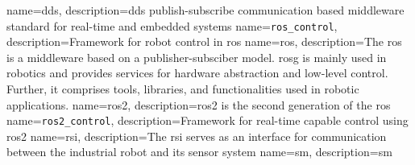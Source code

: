 \hyphenation{
}

\newcommand{\mybibliographyfiles}{Bibliography/ipr_articles,Bibliography/kit_template_example_bibliography,Bibliography/masterthesis}


{
    name=\gls{dds},
    description={\acrlong{dds} publish-subscribe communication based middleware standard for real-time and embedded systems \cite{noauthor_data_nodate}}
}
{
    name=\texttt{ros\_control},
    description={Framework for robot control in \gls{ros}}
}
{
    name=\gls{ros},
    description={The \acrlong{ros} is a middleware based on a publisher-subsciber model. \gls{rosg} is mainly used in robotics and provides services for hardware abstraction and low-level control. Further, it comprises tools, libraries, and functionalities used in robotic applications.}
}
{
    name=\gls{ros2},
    description={\acrlong{ros2} is the second generation of the \acrlong{ros} \cite{macenski_robot_2022}}
}
{
    name=\texttt{ros2\_control},
    description={Framework for real-time capable control using \gls{ros2}}
}
{
    name=\gls{rsi},
    description={The \acrlong{rsi} serves as an interface for communication between the industrial robot and its sensor system }
}
{
    name=\gls{sm},
    description={\acrlong{sm}}
}